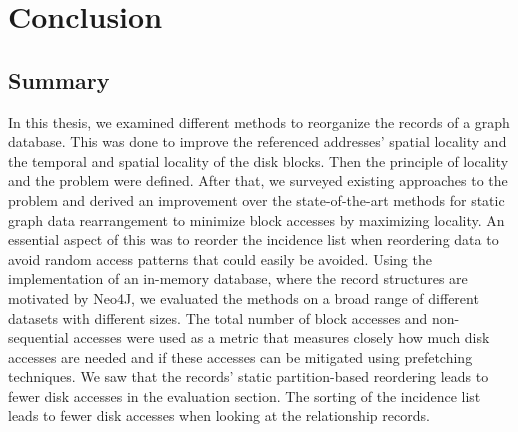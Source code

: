 \chapter{Conclusion}\label{\positionnumber}

\section{Summary}\label{\positionnumber}
In this thesis, we examined different methods to reorganize the records of a graph database.
This was done to improve the referenced addresses' spatial locality and the temporal and spatial locality of the disk blocks.
Then the principle of locality and the problem were defined.
After that, we surveyed existing approaches to the problem and derived an improvement over the state-of-the-art methods for static graph data rearrangement to minimize block accesses by maximizing locality.
An essential aspect of this was to reorder the incidence list when reordering data to avoid random access patterns that could easily be avoided.
Using the implementation of an in-memory database, where the record structures are motivated by Neo4J, we evaluated the methods on a broad range of different datasets with different sizes.
The total number of block accesses and non-sequential accesses were used as a metric that measures closely how much disk accesses are needed and if these accesses can be mitigated using prefetching techniques.  
We saw that the records' static partition-based reordering leads to fewer disk accesses in the evaluation section.
The sorting of the incidence list leads to fewer disk accesses when looking at the relationship records.

